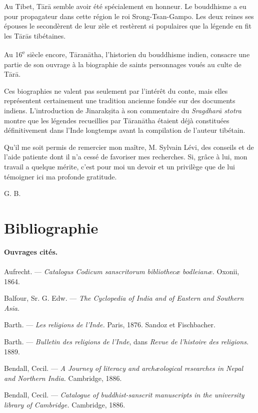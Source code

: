 \documentclass[a4paper, 11pt, oneside, french]{article}
\begin{document}
Au Tibet, T\={a}r\={a} semble avoir été spécialement en honneur. Le bouddhisme a eu pour propagateur dans cette région le roi Srong-Tsan-Gampo. Les deux reines ses épouses le secondèrent de leur zèle et restèrent si populaires que la légende en fit les T\={a}r\={a}s tibétaines.

Au 16\textsuperscript{e} siècle encore, T\={a}ran\={a}tha, l'historien du bouddhisme indien, consacre une partie de son ouvrage à la biographie de saints personnages voués au culte de T\={a}r\={a}.

Ces biographies ne valent pas seulement par l'intérêt du conte, mais elles représentent certainement une tradition ancienne fondée sur des documents indiens. L'introduction de Jinarak\d{s}ita à son commentaire du \emph{Sragdhar\={a} stotra} montre que les légendes recueillies par T\={a}ran\={a}tha étaient déjà constituées définitivement dans l'Inde longtemps avant la compilation de l'auteur tibétain.

Qu'il me soit permis de remercier mon maître, M. Sylvain Lévi, des conseils et de l'aide patiente dont il n'a cessé de favoriser mes recherches. Si, grâce à lui, mon travail a quelque mérite, c'est pour moi un devoir et un privilège que de lui témoigner ici ma profonde gratitude.

\bigskip

G. B.
\clearpage
\section*{Bibliographie}
\begin{center}
\textbf{Ouvrages cités.}
\end{center}
\footnotesize
\paragraph{}
Aufrecht. --- \emph{Catalogus Codicum sanscritorum bibliothecæ bodleianæ.} Oxonii, 1864.

Balfour, Sr. G. Edw. --- \emph{The Cyclopedia of India and of Eastern and Southern Asia.}

Barth. --- \emph{Les religions de l'Inde.} Paris, 1876. Sandoz et Fischbacher.

Barth. --- \emph{Bulletin des religions de l'Inde}, dans \emph{Revue de l'histoire des religions.} 1889.

Bendall, Cecil. --- \emph{A Journey of literacy and archæological researches in Nepal and Northern India.} Cambridge, 1886.

Bendall, Cecil. --- \emph{Catalogue of buddhist-sanscrit manuscripts in the university library of Cambridge.} Cambridge, 1886.
\end{document}

